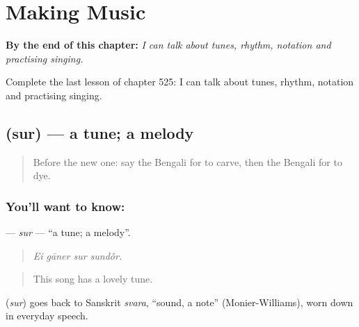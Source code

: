 
\chapter{Making Music}
\label{ch:bn-making-music}

\begin{chapteropening}
\textbf{By the end of this chapter:} \emph{I can talk about tunes, rhythm, notation and practising singing.}

Complete the last lesson of chapter 525: I can talk about tunes, rhythm, notation and practising singing.
\end{chapteropening}

\section[\texorpdfstring{\bn{সুর} (sur)}{সুর (sur)}]{ (sur) — a tune; a melody}

\label{lesson:BN-C525-sur}



\begin{quote}
Before the new one: say the Bengali for to carve, then the Bengali for to dye.
\end{quote}

\subsection*{You'll want to know: }
\textbf{} — \emph{sur} — \textquotedblleft{}a tune; a melody\textquotedblright{}.

\begin{quote}
   
\end{quote}

\begin{quote}
\emph{Ei gāner sur sundôr.}
\end{quote}

\begin{quote}
This song has a lovely tune.
\end{quote}

\begin{cousinweb}
\textbf{} (\emph{sur}) goes back to Sanskrit \emph{svara}, \textquotedblleft{}sound, a note\textquotedblright{} (Monier-Williams), worn down in everyday speech.
\end{cousinweb}

